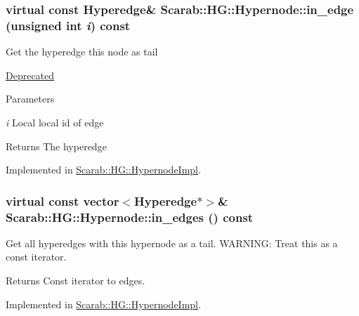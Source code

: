\hypertarget{classScarab_1_1HG_1_1Hypernode_a533d3e0bc2269ec07edbda32305daf70}{
\subsubsection[{in\_\-edge}]{\setlength{\rightskip}{0pt plus 5cm}virtual const {\bf Hyperedge}\& Scarab::HG::Hypernode::in\_\-edge (unsigned int {\em i}) const}}
\label{classScarab_1_1HG_1_1Hypernode_a533d3e0bc2269ec07edbda32305daf70}
Get the hyperedge this node as tail \begin{Desc}
\item[\hyperlink{deprecated__deprecated000010}{Deprecated}]\end{Desc}

\begin{DoxyParams}{Parameters}
\item[{\em i}]Local local id of edge\end{DoxyParams}
\begin{DoxyReturn}{Returns}
The hyperedge 
\end{DoxyReturn}


Implemented in \hyperlink{classScarab_1_1HG_1_1HypernodeImpl_a26ff9db30c03c7b74181e9f901aa71d4}{Scarab::HG::HypernodeImpl}.

\hypertarget{classScarab_1_1HG_1_1Hypernode_aad118748408663b8242dc52d45bbd49d}{
\subsubsection[{in\_\-edges}]{\setlength{\rightskip}{0pt plus 5cm}virtual const vector$<${\bf Hyperedge}$\ast$$>$\& Scarab::HG::Hypernode::in\_\-edges () const}}
\label{classScarab_1_1HG_1_1Hypernode_aad118748408663b8242dc52d45bbd49d}
Get all hyperedges with this hypernode as a tail. WARNING: Treat this as a const iterator. \begin{DoxyReturn}{Returns}
Const iterator to edges. 
\end{DoxyReturn}


Implemented in \hyperlink{classScarab_1_1HG_1_1HypernodeImpl_a77fe0de2e3927be6145cb8fc018088c9}{Scarab::HG::HypernodeImpl}.

